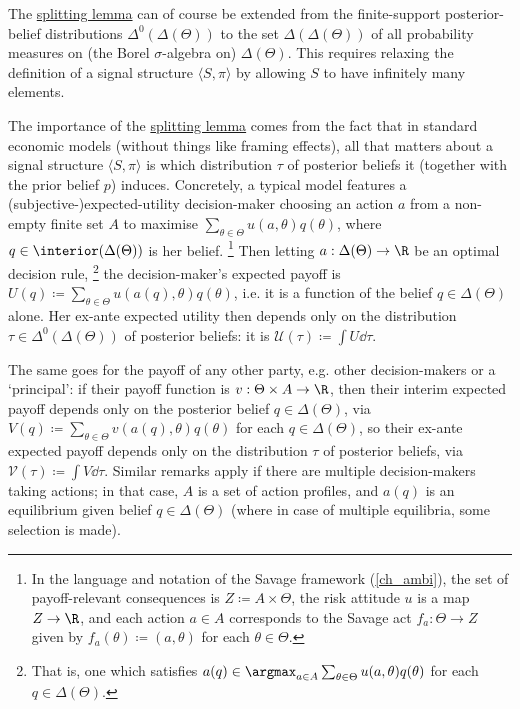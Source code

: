 \begin{remark}
	\label{remark:split_infinite}
	
	The \hyperref[lemma:split]{splitting lemma} can of course be extended from the finite-support posterior-belief distributions $\Delta^0(\Delta(\Theta))$ to the set $\Delta(\Delta(\Theta))$ of all probability measures on (the Borel $\sigma$-algebra on) $\Delta(\Theta)$. This requires relaxing the definition of a signal structure $\langle S, \pi \rangle $ by allowing $S$ to have infinitely many elements.
\end{remark}

The importance of the \hyperref[lemma:split]{splitting lemma} comes from the fact that in standard economic models (without things like framing effects), all that matters about a signal structure $\langle S, \pi \rangle $ is which distribution $\tau$ of posterior beliefs it (together with the prior belief $p$) induces. Concretely, a typical model features a (subjective-)expected-utility decision-maker choosing an action $a$ from a non-empty finite set $A$ to maximise $\sum_{\theta \in \Theta} u(a,\theta) q(\theta)$, where $q \in \interior(\Delta(\Theta))$ is her belief.%
	\footnote{In the language and notation of the Savage framework (\cref{ch_ambi}), the set of payoff-relevant consequences is $Z \coloneqq A \times \Theta$, the risk attitude $u$ is a map $Z \to \R$, and each action $a \in A$ corresponds to the Savage act $f_a : \Theta \to Z$ given by $f_a(\theta) \coloneqq (a,\theta)$ for each $\theta \in \Theta$.}
Then letting $a : \Delta(\Theta) \to \R$ be an optimal decision rule,%
	\footnote{That is, one which satisfies $a(q) \in \argmax_{a \in A} \sum_{\theta \in \Theta} u(a,\theta) q(\theta)$ for each $q \in \Delta(\Theta)$.}
the decision-maker's expected payoff is $U(q) \coloneqq \sum_{\theta \in \Theta} u(a(q),\theta) q(\theta)$, i.e. it is a function of the belief $q \in \Delta(\Theta)$ alone. Her ex-ante expected utility then depends only on the distribution $\tau \in \Delta^0(\Delta(\Theta))$ of posterior beliefs: it is $\mathcal{U}(\tau) \coloneqq \int U \dd \tau$.

The same goes for the payoff of any other party, e.g. other decision-makers or a `principal': if their payoff function is $v : \Theta \times A \to \R$, then their interim expected payoff depends only on the posterior belief $q \in \Delta(\Theta)$, via $V(q) \coloneqq \sum_{\theta \in \Theta} v(a(q),\theta) q(\theta)$ for each $q \in \Delta(\Theta)$, so their ex-ante expected payoff depends only on the distribution $\tau$ of posterior beliefs, via $\mathcal{V}(\tau) \coloneqq \int V \dd \tau$. Similar remarks apply if there are multiple decision-makers taking actions; in that case, $A$ is a set of action profiles, and $a(q)$ is an equilibrium given belief $q \in \Delta(\Theta)$ (where in case of multiple equilibria, some selection is made).

